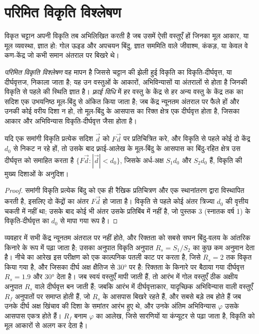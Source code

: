 \section{परिमित विकृति विश्लेषण}\label{sec:b3:structural-analysis:strain}

विकृत चट्टान अपनी विकृति तब अभिलिखित करती है जब उसमें ऐसी वस्तुएँ हों
जिनका मूल आकार, या मूल व्यवस्था, ज्ञात हो: गोल ऊइड और अपचयन बिंदु,
ज्ञात सममिति वाले जीवाश्म, कंकड़, या केवल वे कण-केंद्र
जो कभी समान अंतराल पर बिखरे थे।

\begin{definition}[परिमित विकृति विश्लेषण, फ़्राई विधि]\label{def:b3:structural-analysis:strain-analysis}
\emph{परिमित विकृति विश्लेषण} वह मापन है
जिससे चट्टान की झेली हुई विकृति का विकृति-दीर्घवृत्त, या दीर्घवृत्तज, निकाला जाता है;
यह उन वस्तुओं के आकारों, अभिविन्यासों या अंतरालों से होता है
जिनकी विकृति से पहले की स्थिति ज्ञात है। \emph{फ़्राई विधि} में
हर वस्तु के केंद्र से हर अन्य वस्तु के केंद्र तक का सदिश एक उभयनिष्ठ मूल-बिंदु से अंकित किया जाता है;
जब केंद्र न्यूनतम अंतराल पर फैले हों और उनकी कोई वरीय दिशा न हो,
तो मूल-बिंदु के आसपास का रिक्त क्षेत्र एक दीर्घवृत्त होता है,
जिसका आकार और अभिविन्यास विकृति-दीर्घवृत्त जैसा होता है।
\end{definition}

\begin{proposition}[फ़्राई रिक्ति]\label{prop:b3:structural-analysis:fry}
यदि एक समांगी विकृति प्रत्येक सदिश $\vec d$ को $F\vec d$ पर प्रतिचित्रित करे, और विकृति से पहले कोई दो
केंद्र $d_0$ से निकट न रहे हों, तो उसके बाद फ़्राई-आलेख के मूल-बिंदु के आसपास का बिंदु-रहित क्षेत्र
उस दीर्घवृत्त को समाहित करता है
$\{F\vec d : |\vec d| < d_0\}$, जिसके अर्ध-अक्ष $S_1d_0$ और $S_2d_0$ हैं,
विकृति की मुख्य दिशाओं के अनुदिश।
\end{proposition}

\begin{proof}
समांगी विकृति प्रत्येक बिंदु को एक ही रैखिक प्रतिचित्रण और एक स्थानांतरण
द्वारा विस्थापित करती है, इसलिए दो केंद्रों का अंतर $F\vec d$ हो जाता है। विकृति से पहले
कोई अंतर त्रिज्या $d_0$ की वृत्तीय चकती में नहीं था; उसके बाद कोई भी अंतर उसके
प्रतिबिंब में नहीं है, जो पुस्तक 3 (स्नातक वर्ष 1) के विकृति-दीर्घवृत्त का $d_0$ से मापा गया रूप है।
\end{proof}

व्यवहार में सभी केंद्र न्यूनतम अंतराल पर नहीं होते, और रिक्तता को
सबसे सघन बिंदु-वलय के आंतरिक किनारे के रूप में पढ़ा जाता है; उसका अनुपात
विकृति अनुपात $R_s = S_1/S_2$ का कुछ कम अनुमान देता है। नीचे का आरेख इस परीक्षण को
एक काल्पनिक पतली काट पर करता है, जिसे $R_s = 2$ तक विकृत किया गया है, और जिसका दीर्घ अक्ष
क्षैतिज से \ang{30} पर है: रिक्तता के किनारे पर बैठाया गया दीर्घवृत्त
$R_s = 1.9$ और \ang{30} देता है। जब स्वयं वस्तुएँ मापी जाती हैं, तो
आरंभ में गोल वस्तुएँ ठीक अक्षीय अनुपात $R_s$ वाले दीर्घवृत्त बन जाती हैं; जबकि
आरंभ में दीर्घवृत्ताकार, यादृच्छिक अभिविन्यास वाली वस्तुएँ $R_f$ अनुपातों पर समाप्त होती हैं, जो
$R_s$ के आसपास बिखरे रहते हैं, और सबसे बड़े तब होते हैं जब उनके दीर्घ अक्ष
खिंचाव की दिशा के समांतर आरंभ हुए थे, और उनके अंतिम अभिविन्यास $\varphi$ उसके
आसपास एकत्र होते हैं। $R_f$ बनाम $\varphi$ का आलेख, जिसे सारणियों या कंप्यूटर से पढ़ा जाता है,
विकृति को मूल आकारों से अलग कर देता है।

